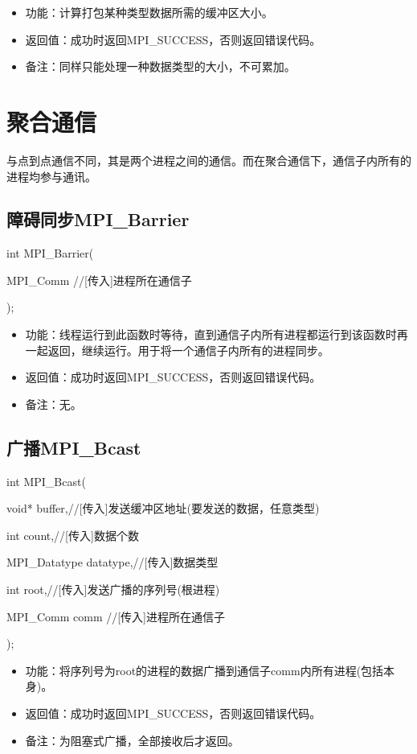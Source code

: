 \documentclass[UTF8]{article}%
\begin{document}
\begin{itemize}
    \item 功能：计算打包某种类型数据所需的缓冲区大小。
    \item 返回值：成功时返回MPI\_SUCCESS，否则返回错误代码。
    \item 备注：同样只能处理一种数据类型的大小，不可累加。
\end{itemize}

\section{聚合通信}

与点到点通信不同，其是两个进程之间的通信。而在聚合通信下，通信子内所有的进程均参与通讯。

\subsection{障碍同步MPI\_Barrier}

int MPI\_Barrier(
    
    \qquad MPI\_Comm //[传入]进程所在通信子
    
);

\begin{itemize}
    \item 功能：线程运行到此函数时等待，直到通信子内所有进程都运行到该函数时再一起返回，继续运行。用于将一个通信子内所有的进程同步。
    \item 返回值：成功时返回MPI\_SUCCESS，否则返回错误代码。
    \item 备注：无。
\end{itemize}

\subsection{广播MPI\_Bcast}

int MPI\_Bcast(

    \qquad void* buffer,//[传入]发送缓冲区地址(要发送的数据，任意类型)
    
    \qquad int count,//[传入]数据个数
    
    \qquad MPI\_Datatype datatype,//[传入]数据类型
    
    \qquad int root,//[传入]发送广播的序列号(根进程)
    
    \qquad MPI\_Comm comm //[传入]进程所在通信子
    
);

\begin{itemize}
    \item 功能：将序列号为root的进程的数据广播到通信子comm内所有进程(包括本身)。
    \item 返回值：成功时返回MPI\_SUCCESS，否则返回错误代码。
    \item 备注：为阻塞式广播，全部接收后才返回。
\end{itemize}
\end{document}
